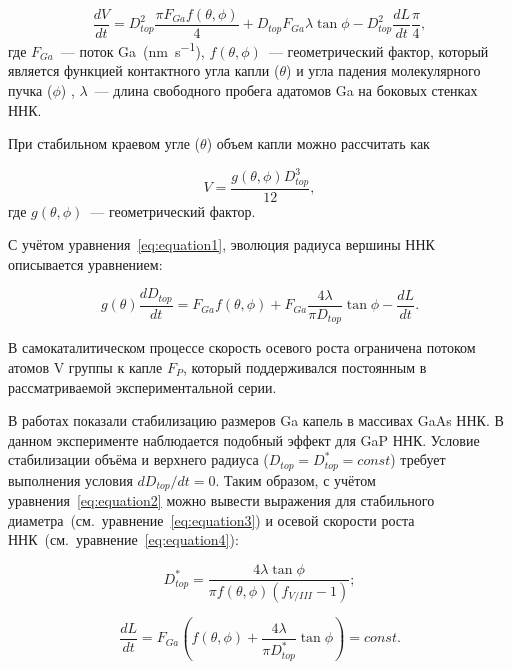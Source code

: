 \begin{equation} \label{eq:equation1} \frac{dV}{dt}=D_{top}^2 \frac{\pi F_{Ga}
	f(\theta,\phi)}{4}+ D_{top} F_{Ga} \lambda \tan{\phi} - D_{top}^2 \frac{dL}{dt}
	\frac{\pi}{4},
\end{equation}
где \(F_{Ga}\)~--- поток Ga~(\si{\nano\meter\per\second}),
\(f(\theta,\phi)\)~--- геометрический фактор, который является функцией
контактного угла капли (\(\theta\)) и угла падения молекулярного пучка
(\(\phi\)) \cite{glas2010vapor}, \(\lambda\)~--- длина свободного пробега
адатомов Ga на боковых стенках ННК.

При стабильном краевом угле (\(\theta\)) объем капли можно рассчитать как

\begin{equation}
	\label{eq:equation7} V=\frac{g(\theta,\phi)D_{top}^3}{12},
\end{equation}
где \(g(\theta,\phi)\)~--- геометрический фактор.

С учётом уравнения~\ref{eq:equation1}, эволюция радиуса вершины ННК описывается
уравнением:

\begin{equation} \label{eq:equation2} g(\theta) \frac{dD_{top}}{dt}=F_{Ga}
	f(\theta,\phi)+ F_{Ga} \frac{4 \lambda}{\pi D_{top}} \tan{\phi}-\frac{dL}{dt}.
\end{equation}

В самокаталитическом процессе скорость осевого роста ограничена потоком атомов
V группы к капле \(F_P\), который поддерживался постоянным в рассматриваемой
экспериментальной серии.

В работах
\cite{tersoff2015stable,dubrovskii2016regimes,berdnikov2020comparison} показали
стабилизацию размеров Ga капель в массивах GaAs ННК. В данном эксперименте наблюдается подобный эффект для GaP
ННК. Условие стабилизации объёма и верхнего
радиуса (\(D_{top} = D_{top}^\ast = const\)) требует выполнения условия
\(dD_{top} / dt = 0\). Таким образом, с учётом уравнения~\ref{eq:equation2}
можно вывести выражения для стабильного
диаметра~(см.~уравнение~\ref{eq:equation3}) и осевой скорости роста
ННК~(см.~уравнение~\ref{eq:equation4}):

\begin{equation} \label{eq:equation3}
D_{top}^\ast=\frac{4 \lambda \tan{\phi}}{\pi f(\theta,\phi)(f_{V/III}-1)};
\end{equation}

\begin{equation} \label{eq:equation4} \frac{dL}{dt}=F_{Ga} \left(
	f(\theta,\phi) + \frac{4 \lambda}{\pi D_{top}^\ast}\tan{\phi} \right)=const.
\end{equation}

